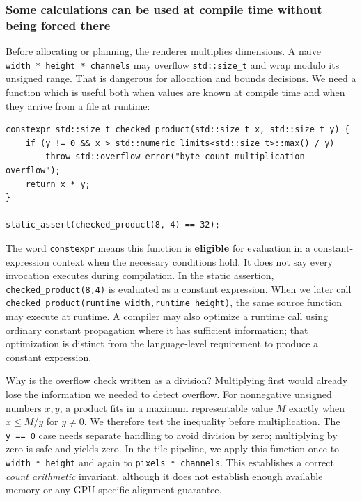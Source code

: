 \subsubsection{Some calculations can be used at compile time without being forced there}\label{some-calculations-can-be-used-at-compile-time-without-being-forced-there}

Before allocating or planning, the renderer multiplies dimensions. A naive \texttt{width\ *\ height\ *\ channels} may overflow \texttt{std::size\_t} and wrap modulo its unsigned range. That is dangerous for allocation and bounds decisions. We need a function which is useful both when values are known at compile time and when they arrive from a file at runtime:

\begin{verbatim}
constexpr std::size_t checked_product(std::size_t x, std::size_t y) {
    if (y != 0 && x > std::numeric_limits<std::size_t>::max() / y)
        throw std::overflow_error("byte-count multiplication overflow");
    return x * y;
}

static_assert(checked_product(8, 4) == 32);
\end{verbatim}

The word \texttt{constexpr} means this function is \textbf{eligible} for evaluation in a constant-expression context when the necessary conditions hold. It does not say every invocation executes during compilation. In the static assertion, \texttt{checked\_product(8,4)} is evaluated as a constant expression. When we later call \texttt{checked\_product(runtime\_width,runtime\_height)}, the same source function may execute at runtime. A compiler may also optimize a runtime call using ordinary constant propagation where it has sufficient information; that optimization is distinct from the language-level requirement to produce a constant expression.

Why is the overflow check written as a division? Multiplying first would already lose the information we needed to detect overflow. For nonnegative unsigned numbers \(x,y\), a product fits in a maximum representable value \(M\) exactly when \(x\le M/y\) for \(y\ne0\). We therefore test the inequality before multiplication. The \texttt{y\ ==\ 0} case needs separate handling to avoid division by zero; multiplying by zero is safe and yields zero. In the tile pipeline, we apply this function once to \texttt{width\ *\ height} and again to \texttt{pixels\ *\ channels}. This establishes a correct \emph{count arithmetic} invariant, although it does not establish enough available memory or any GPU-specific alignment guarantee.

